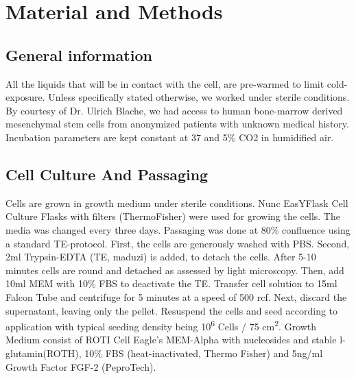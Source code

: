 \renewcommand{\package}{\emph}
\newcommand{\product}{\textit}

\chapter{Material and Methods}

\section{General information}
All the liquids that will be in contact with the cell, are pre-warmed to limit cold-exposure. Unless specifically stated otherwise, we worked under sterile conditions. By courtesy of Dr. Ulrich Blache, we had access to human bone-marrow derived mesenchymal stem cells from anonymized patients with unknown medical history. Incubation parameters are kept constant at 37 \degC{} and 5\% CO2 in humidified air.

\section{Cell Culture And Passaging}

Cells are grown in growth medium under sterile conditions. Nunc\texttrademark{} EasYFlask\texttrademark{} Cell Culture Flasks with filters (ThermoFisher) were used for growing the cells. The media was changed every three days. Passaging was done at 80\% confluence using a standard TE-protocol. First, the cells are generously washed with PBS. Second, 2ml Trypsin-EDTA (TE, maduzi) is added, to detach the cells. After 5-10 minutes cells are round and detached as assessed by light microscopy. Then, add 10ml MEM\textalpha{} with 10\% FBS to deactivate the TE. Transfer cell solution to 15ml Falcon Tube and centrifuge for 5 minutes at a speed of 500 rcf. Next, discard the supernatant, leaving only the pellet. Resuspend the cells and seed according to application with typical seeding density being 10\textsuperscript{6} Cells / 75 cm\textsuperscript{2}. 
Growth Medium consist of ROTI\textregistered{} Cell Eagle's MEM-Alpha with nucleosides and stable l-glutamin(ROTH), 10\% FBS (heat-inactivated, Thermo Fisher) and 5ng/ml Growth Factor FGF-2 (PeproTech).

